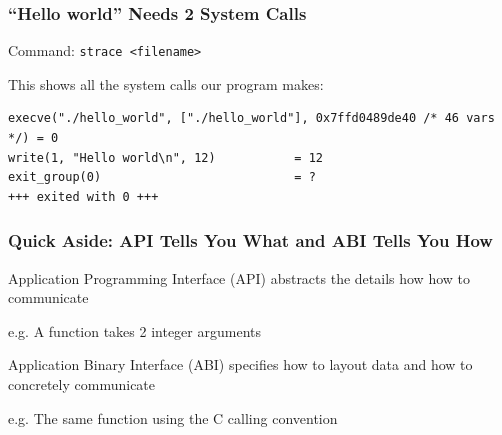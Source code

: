   \begin{frame}[fragile]
    \frametitle{``Hello world'' Needs 2 System Calls}

    Command: \hspace{0.5em} \texttt{strace <filename>}

    \vspace{2em}
    
    This shows all the system calls our program makes:

    \vspace{2em}

    \begin{lstlisting}[basicstyle=\scriptsize\ttfamily]
execve("./hello_world", ["./hello_world"], 0x7ffd0489de40 /* 46 vars */) = 0
write(1, "Hello world\n", 12)           = 12
exit_group(0)                           = ?
+++ exited with 0 +++
    \end{lstlisting}
  \end{frame}

  \begin{frame}
    \frametitle{Quick Aside: API Tells You What and ABI Tells You How} 

    Application Programming Interface (API) abstracts the details how how to
    communicate

    \vspace{2em}

    \hspace{2em} e.g. A function takes 2 integer arguments

    \vspace{4em}

    Application Binary Interface (ABI) specifies how to layout data and how to
    concretely communicate

    \vspace{2em}

    \hspace{2em} e.g. The same function using the C calling convention
  \end{frame}

